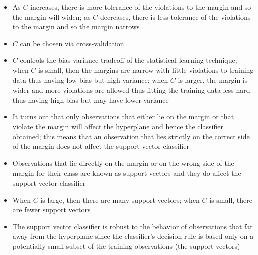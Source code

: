 \documentclass[12pt]{article}
\begin{document}
\begin{itemize}
\item As $C$ increases, there is more tolerance of the violations to the margin and so the margin will widen; as $C$ decreases, there is less tolerance of the violations to the margin and so the margin narrows 
\item $C$ can be chosen via cross-validation
\item $C$ controls the bias-variance tradeoff of the statistical learning technique; when $C$ is small, then the margins are narrow with little violations to training data thus having low bias but high variance; when $C$ is larger, the margin is wider and more violations are allowed thus fitting the training data less hard thus having high bias but may have lower variance 
\item It turns out that only observations that either lie on the margin or that violate the margin will affect the hyperplane and hence the classifier obtained; this means that an observation that lies strictly on the correct side of the margin does not affect the support vector classifier 
\item Observations that lie directly on the margin or on the wrong side of the margin for their class are known as support vectors and they do affect the support vector classifier 
\item When $C$ is large, then there are many support vectors; when $C$ is small, there are fewer support vectors 
\item The support vector classifier is robust to the behavior of observations that far away from the hyperplane since the classifier's decision rule is based only on a potentially small subset of the training observations (the support vectors)
\end{itemize}
\end{document}
